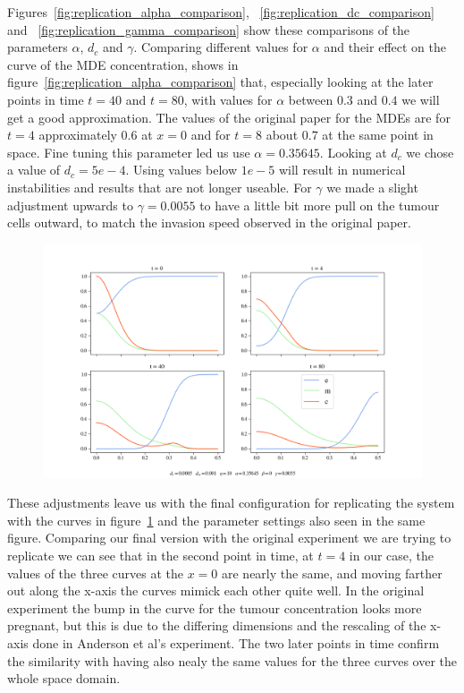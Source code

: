 Figures~\ref{fig:replication_alpha_comparison}, ~\ref{fig:replication_dc_comparison} and ~\ref{fig:replication_gamma_comparison} show these comparisons of the parameters $\alpha$, $d_c$ and $\gamma$. Comparing different values for $\alpha$ and their effect on the curve of the MDE concentration, shows in figure~\ref{fig:replication_alpha_comparison} that, especially looking at the later points in time $t=40$ and $t=80$, with values for $\alpha$ between $0.3$ and $0.4$ we will get a good approximation. The values of the original paper for the MDEs are for $t=4$ approximately $0.6$ at $x=0$ and for $t=8$ about $0.7$ at the same point in space. Fine tuning this parameter led us use $\alpha=0.35645$.\newline 
Looking at $d_c$ we chose a value of $d_c=5e-4$. Using values below $1e-5$ will result in numerical instabilities and results that are not longer useable. For $\gamma$ we made a slight adjustment upwards to $\gamma=0.0055$ to have a little bit more pull on the tumour cells outward, to match the invasion speed observed in the original paper. 
\begin{figure}[h]
    \centering
    \includegraphics[width=\textwidth]{resources/images/basecase_without_proliferation.png}
    \label{fig:basecase_without_proliferation}
\end{figure}

These adjustments leave us with the final configuration for replicating the system with the curves in figure~\ref{fig:basecase_without_proliferation} and the parameter settings also seen in the same figure. Comparing our final version with the original experiment we are trying to replicate we can see that in the second point in time, at $t=4$ in our case, the values of the three curves at the $x=0$ are nearly the same, and moving farther out along the x-axis the curves mimick each other quite well. In the original experiment the bump in the curve for the tumour concentration looks more pregnant, but this is due to the differing dimensions and the rescaling of the x-axis done in Anderson et al's experiment. The two later points in time confirm the similarity with having also nealy the same values for the three curves over the whole space domain.



